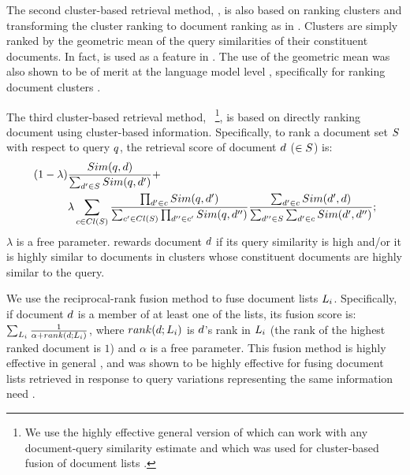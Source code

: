 
The second cluster-based retrieval method, \geoClust \cite{Kurland+Krikon:11a}, is also based on ranking clusters and transforming the cluster ranking to document ranking as in \clustMRF \cite{Raiber+Kurland:13a}. Clusters are simply ranked by the geometric mean of the query similarities of their constituent documents. In fact, \geoClust is used as a feature in \clustMRF. The use of the geometric mean was also shown to be of merit at the language model level \cite{Seo+Croft:10a}, specifically for ranking document clusters \cite{Liu+Croft:08a}.


The third cluster-based retrieval method,
\interp~\cite{Kurland:09a,Kozorovitzky+Kurland:11b}\footnote{We use the highly effective general version of \interp which can work with any document-query similarity estimate and which was used for cluster-based fusion of document lists \cite{Kozorovitzky+Kurland:11b}.}, is based on
directly ranking document using cluster-based
information. Specifically, to rank a document set $S$ with respect to query $q$, the
retrieval score of document $d$ ($\in S$) is:
\begin{align}
  \label{eq:interpf}
(1-\lambda)
&\frac{Sim(q,d)}{\sum_{d' \in S}
  Sim(q,d')} +  \\
& \lambda \sum_{c \in Cl(S)}
\frac{\prod_{d' \in c} Sim(q,d')}{\sum_{c' \in Cl(S)} \prod_{d'' \in c'} Sim(q,d'')}  \frac{\sum_{d' \in c} Sim(d',d)}{\sum_{d'' \in S}\sum_{d' \in c} Sim(d',d'')}; \notag
\end{align}
$\lambda$ is a free parameter.
\interp rewards document $d$ if its query similarity is high and/or it is highly similar to documents in clusters whose constituent documents are highly similar to the query.



 We use the reciprocal-rank fusion method
\cite{Cormack+al:09a} to fuse document lists
$L_i$. Specifically, if document $d$ is a member of at least
one of the lists, its fusion score is: $\sum_{L_i} \frac{1}{\alpha + rank(d;L_i)}$, where
  $rank(d;L_i)$ is $d$'s rank in $L_i$ (the rank of the highest ranked document is $1$) and
  $\alpha$ is a free parameter. This fusion method is highly effective in general \cite{Anava+al:16a}, and was shown to be highly effective for fusing document lists retrieved in response to query variations representing the same information need \cite{bailey2017retrieval,bc17-adcs}.
